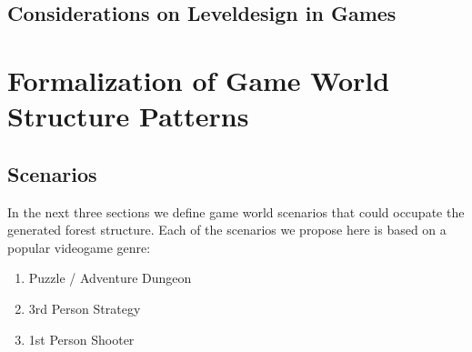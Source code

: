
 
  

%
%



\section{Considerations on Leveldesign in Games}


\chapter{Formalization of Game World Structure Patterns}
\label{sec:scenarios}


\section{Scenarios} 
In the next three sections we define game world scenarios that could occupate the generated forest structure. Each of the scenarios we propose here is based on a popular videogame genre: 

\begin{enumerate}
\item Puzzle / Adventure Dungeon
\item 3rd Person Strategy 
\item 1st Person Shooter
\end{enumerate} 




